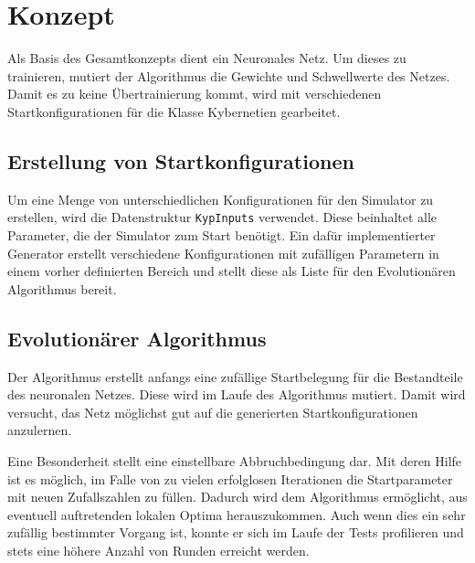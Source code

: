 \chapter{Konzept}

Als Basis des Gesamtkonzepts dient ein Neuronales Netz. Um dieses zu trainieren, mutiert der Algorithmus die Gewichte und Schwellwerte des Netzes. Damit es zu keine Übertrainierung kommt, wird mit verschiedenen Startkonfigurationen für die Klasse Kybernetien gearbeitet.

\section{Erstellung von Startkonfigurationen}
Um eine Menge von unterschiedlichen Konfigurationen für den Simulator zu erstellen, wird die Datenstruktur \verb+KypInputs+ verwendet. Diese beinhaltet alle Parameter, die der Simulator zum Start benötigt. Ein dafür implementierter Generator erstellt verschiedene Konfigurationen mit zufälligen Parametern in einem vorher definierten Bereich und stellt diese als Liste für den Evolutionären Algorithmus bereit. 

\section{Evolutionärer Algorithmus}
Der Algorithmus erstellt anfangs eine zufällige Startbelegung für die Bestandteile des neuronalen Netzes. Diese wird im Laufe des Algorithmus mutiert. Damit wird versucht, das Netz möglichst gut auf die generierten Startkonfigurationen anzulernen.

Eine Besonderheit stellt eine einstellbare Abbruchbedingung dar. Mit deren Hilfe ist es möglich, im Falle von zu vielen erfolglosen Iterationen die Startparameter mit neuen Zufallszahlen zu füllen. Dadurch wird dem Algorithmus ermöglicht, aus eventuell auftretenden lokalen Optima herauszukommen. Auch wenn dies ein sehr zufällig bestimmter Vorgang ist, konnte er sich im Laufe der Tests profilieren und stets eine höhere Anzahl von Runden erreicht werden.
